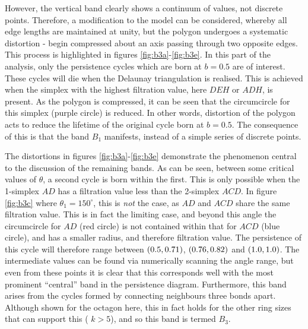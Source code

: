 However, the vertical band clearly shows a continuum of values, not discrete points.
Therefore, a modification to the model can be considered, whereby all edge lengths are maintained at unity, but the polygon undergoes a systematic distortion - begin compressed about an axis passing through two opposite edges.
This process is highlighted in figures \ref{fig:b3a}\--\ref{fig:b3e}.
In this part of the analysis, only the persistence cycles which are born at $b=0.5$ are of interest.
These cycles will die when the Delaunay triangulation is realised.
This is achieved when the simplex with the highest filtration value, here $DEH$ or $ADH$, is present.
As the polygon is compressed, it can be seen that the circumcircle for this simplex (purple circle) is reduced.
In other words, distortion of the polygon acts to reduce the lifetime of the original cycle born at $b=0.5$.
The consequence of this is that the band $B_1$ manifests, instead of a simple series of discrete points.

The distortions in figures \ref{fig:b3a}\--\ref{fig:b3e} demonstrate the phenomenon central to the discussion of the remaining bands.
As can be seen, between some critical values of $\theta$, a second cycle is born within the first.
This is only possible when the 1\--simplex $AD$ has a filtration value less than the 2\--simplex $ACD$.
In figure \ref{fig:b3c} where $\theta_1=150^\circ$, this is \textit{not} the case, as $AD$ and $ACD$ share the same filtration value.
This is in fact the limiting case, and beyond this angle the circumcircle for $AD$ (red circle) is not contained within that for $ACD$ (blue circle), and has a smaller radius, and therefore filtration value.
The persistence of this cycle will therefore range between $\left(0.5,0.71\right)$, $\left(0.76,0.82\right)$ and $\left(1.0,1.0\right)$.
The intermediate values can be found via numerically scanning the angle range, but even from these points it is clear that this corresponds well with the most prominent ``central'' band in the persistence diagram.
Furthermore, this band arises from the cycles formed by connecting neighbours three bonds apart.
Although shown for the octagon here, this in fact holds for the other ring sizes that can support this (\ie{} $k>5$), and so this band is termed $B_3$.


